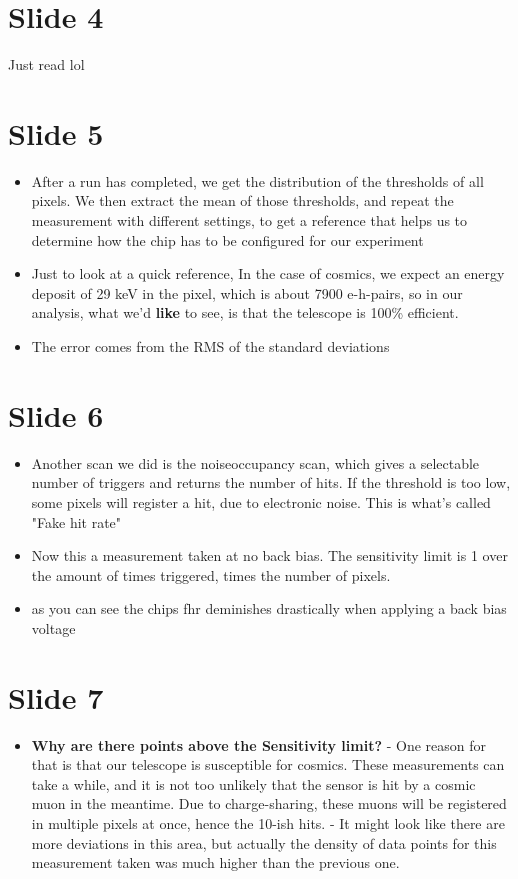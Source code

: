\section*{Slide 4} 
Just read lol
\section*{Slide 5}
\begin{itemize}
    \item After a run has completed, we get the distribution of the thresholds
	of all pixels. We then extract the mean of those thresholds, and 
	repeat the measurement with different settings, to get a reference
	that helps us to determine how the chip has to be configured for 
	our experiment
    \item Just to look at a quick reference,
	In the case of cosmics, we expect an energy deposit of 29 keV in
	the pixel, which is about 7900 e-h-pairs, so in our analysis, what
	we'd \textbf{like} to see, is that the telescope is 100\% efficient.
    \item The error comes from the RMS of the standard deviations
\end{itemize}
\section*{Slide 6} 
\begin{itemize}
    \item Another scan we did is the noiseoccupancy scan, which gives a
	selectable number of triggers and returns the number of hits.
	If the threshold is too low, some pixels will register a hit, due
	to electronic noise. This is what's called "Fake hit rate"
    \item Now this a measurement taken at no back bias. The sensitivity limit
	is 1 over the amount of times triggered, times the number of pixels.
    \item as you can see the chips fhr deminishes drastically when applying a
	back bias voltage
\end{itemize}
\section*{Slide 7} 
\begin{itemize}
    \item \textbf{Why are there points above the Sensitivity limit?}
	- One reason for that is that our telescope is susceptible for
	cosmics. These measurements can take a while, and it is not
	too unlikely that the sensor is hit by a cosmic muon in the
	meantime. Due to charge-sharing, these muons will be
	registered in multiple pixels at once, hence the 10-ish
	hits.
	- It might look like there are more deviations in this area, but
	actually the density of data points for this measurement taken
	was much higher than the previous one.
\end{itemize}
